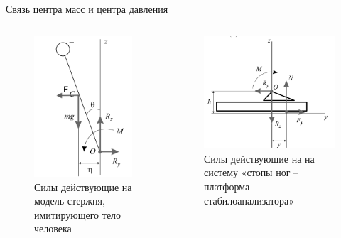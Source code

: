 \documentclass[10pt]{beamer}
\begin{document}
\begin{frame}{Связь центра масс и центра давления}
		\begin{columns}
		\begin{figure}[h!]
			\includegraphics[width=0.7\linewidth]{images/body_1.png}
			\caption{Силы действующие на модель стержня, имитирующего тело человека}
		\end{figure}
		\begin{figure}[h!]
			\includegraphics[width=0.8\linewidth]{images/foot.png}
			\caption{Силы действующие на на систему «стопы ног – платформа стабилоанализатора» }
		\end{figure}
	\end{columns}

\end{frame}
\end{document}
